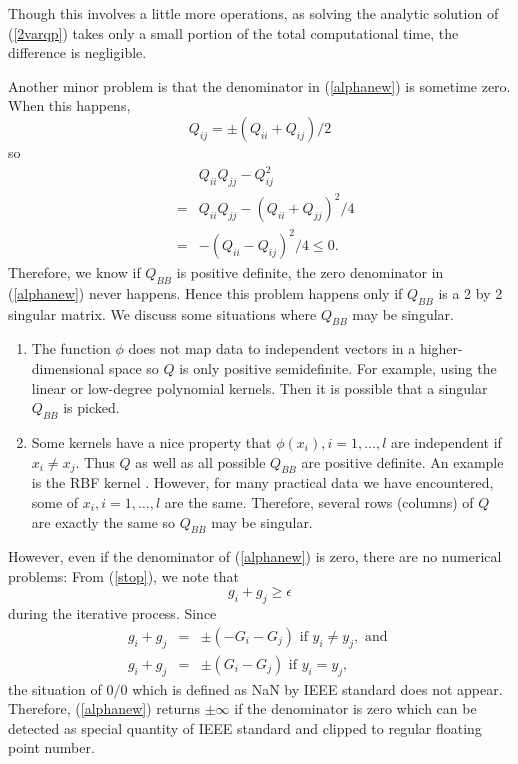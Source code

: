 \documentclass[11pt]{article}
\theoremstyle{break}
\begin{document}
Though this involves a little more
operations,
as solving the analytic solution
of (\ref{2varqp})
takes only a small portion
of the total computational
time, the difference is negligible.

Another minor problem 
is that the denominator
in (\ref{alphanew}) 
is sometime zero.
When this happens,
\begin{equation*}
Q_{ij}  = \pm (Q_{ii} + Q_{ij})/2 
\end{equation*}
so
\begin{eqnarray*}
&& Q_{ii} Q_{jj} - Q_{ij}^2 \\
&=&   Q_{ii} Q_{jj} - (Q_{ii} + Q_{jj})^2/4 \\
&= & -(Q_{ii} - Q_{ij})^2/4 \leq 0.
\end{eqnarray*}
Therefore, we know if $Q_{BB}$ is positive 
definite, 
the zero denominator
in (\ref{alphanew}) 
never happens. 
Hence this problem happens only if 
$Q_{BB}$ is a 2 by 2 singular
matrix.
We discuss some situations where
$Q_{BB}$ may be singular.
\begin{enumerate}
\item The function 
$\phi$ does not map
data to independent vectors
in a higher-dimensional space
so $Q$ is only positive 
semidefinite. For example,
using the linear
or low-degree polynomial
kernels.
Then it is possible that 
a singular $Q_{BB}$ 
is picked.
\item Some kernels have 
a nice property that 
$\phi(x_i), i = 1, \ldots,
l$ are independent if 
$x_i \neq x_j$. 
Thus $Q$ as well as 
all possible 
$Q_{BB}$
are positive definite.
An example is the 
RBF kernel
\cite{CAM86a}.
However, for many practical
data we have encountered,
some of $x_i, i = 1,
\ldots, l$ are the same.
Therefore, several rows
(columns) of $Q$ are 
exactly the same so 
$Q_{BB}$ may be singular.
\end{enumerate}

However, 
even if
the denominator
of (\ref{alphanew}) 
is zero, there are no
numerical problems:
From (\ref{stop}), we note
that
\begin{equation*}
g_{i} + g_{j} \geq \epsilon
\end{equation*}
during the iterative process.
Since
\begin{eqnarray*}
g_i + g_j
& = & \pm(-G_i - G_j) \mbox{ if } y_i \neq y_j,
\mbox{ and } \\
g_i + g_j
& = & \pm(G_i - G_j)
\mbox{ if } y_i = y_j, 
\end{eqnarray*}
the situation of 
$0/0$ which is defined as 
NaN by IEEE standard does not 
appear. Therefore,
(\ref{alphanew}) returns
$\pm \infty$ 
if
the denominator is zero which 
can be 
detected as special quantity 
of 
IEEE standard
and clipped to
regular
      floating point number.
\end{document}
